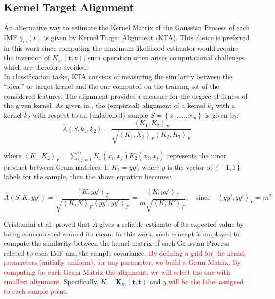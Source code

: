 \subsection{Kernel Target Alignment}

An alternative way to estimate the Kernel Matrix of the Gaussian Process of each IMF $\gamma_m(t)$ is given by Kernel Target Alignment (KTA). This choice is preferred in this work since computing the maximum likelihood estimator would require the inversion of $K_m (\bm{t}, \bm{t})$; such operation often arises computational challenges which are therefore avoided.\\
In classification tasks, KTA consists of measuring the similarity between the ``ideal'' or target kernel and the one computed on the training set of the considered features. The alignment provides a measure for the degree of fitness of the given kernel. As given in \cite{}, the (empirical) alignment of a kernel $k_1$ with a kernel $k_2$ with respect to an (unlabelled) sample $S= \left\lbrace x_1, \dots, x_m \right\rbrace$ is given by:
\begin{equation}
\hat{A} \left(S, k_1, k_2  \right) = \frac{\left\langle K_1, K_2 \right\rangle_F}{\sqrt{\left\langle K_1, K_1 \right\rangle_F \left\langle K_2, K_2 \right\rangle_F}}
\end{equation}

where $\left\langle K_1, K_2 \right\rangle_F = \sum_{i,j = 1}^{m} K_1 (x_i,x_j) K_2 (x_i,x_j)$ represents the inner product between Gram matrices. If $K_2 = yy'$, where $y$ is the vector of $ \left\lbrace -1,1 \right\rbrace $ labels for the sample, then the above equation becomes:

\begin{equation}
\hat{A} \left(S, K, yy'  \right) = \frac{\left\langle  K, yy' \right\rangle_F}{\sqrt{\left\langle K, K \right\rangle_F \left\langle yy',yy' \right\rangle_F}} = \frac{\left\langle  K, yy' \right\rangle_F}{m \sqrt{\left\langle  K, K' \right\rangle_F}}, \quad \mbox{since} \quad \left\langle  yy', yy' \right\rangle_F = m^2
\end{equation}

Cristianini et al. proved that $\hat{A}$ gives a reliable estimate of its expected value by being concentrated around its mean. In this work, such concept is employed to compute the similarity between the kernel matrix of each Gaussian Process related to each IMF and the sample covariance. \textcolor{red}{By defining a grid for the kernel parameters (initially uniform), for any parameter, we build a Gram Matrix. By computing for each Gram Matrix the alignment, we will select the one with smallest alignment.} Specifically, $K = \mathbf{K}_m (\mathbf{t},\mathbf{t})$ and $y$ \textcolor{red}{will be the label assigned to each sample point.}